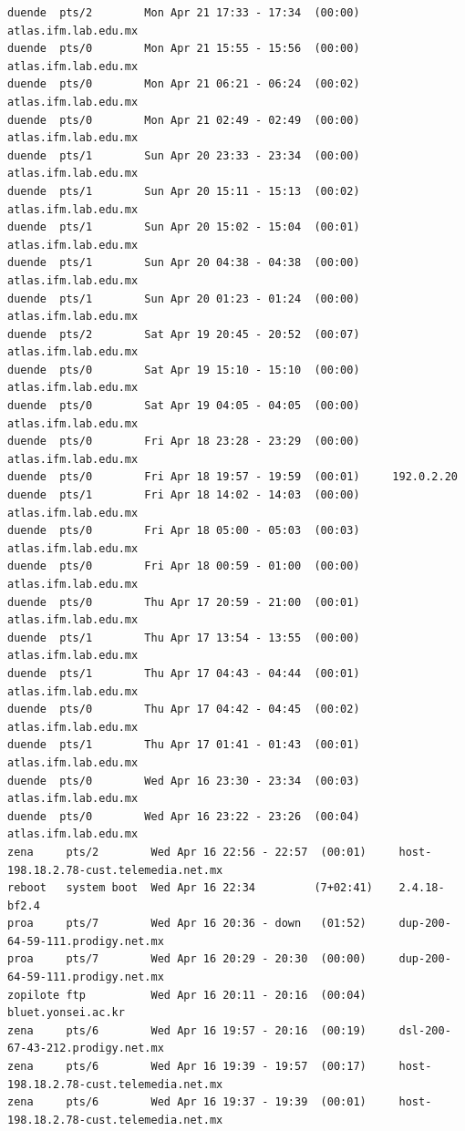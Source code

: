 \begin{lstlisting}[style=terminal]
duende  pts/2        Mon Apr 21 17:33 - 17:34  (00:00)     atlas.ifm.lab.edu.mx
duende  pts/0        Mon Apr 21 15:55 - 15:56  (00:00)     atlas.ifm.lab.edu.mx
duende  pts/0        Mon Apr 21 06:21 - 06:24  (00:02)     atlas.ifm.lab.edu.mx
duende  pts/0        Mon Apr 21 02:49 - 02:49  (00:00)     atlas.ifm.lab.edu.mx
duende  pts/1        Sun Apr 20 23:33 - 23:34  (00:00)     atlas.ifm.lab.edu.mx
duende  pts/1        Sun Apr 20 15:11 - 15:13  (00:02)     atlas.ifm.lab.edu.mx
duende  pts/1        Sun Apr 20 15:02 - 15:04  (00:01)     atlas.ifm.lab.edu.mx
duende  pts/1        Sun Apr 20 04:38 - 04:38  (00:00)     atlas.ifm.lab.edu.mx
duende  pts/1        Sun Apr 20 01:23 - 01:24  (00:00)     atlas.ifm.lab.edu.mx
duende  pts/2        Sat Apr 19 20:45 - 20:52  (00:07)     atlas.ifm.lab.edu.mx
duende  pts/0        Sat Apr 19 15:10 - 15:10  (00:00)     atlas.ifm.lab.edu.mx
duende  pts/0        Sat Apr 19 04:05 - 04:05  (00:00)     atlas.ifm.lab.edu.mx
duende  pts/0        Fri Apr 18 23:28 - 23:29  (00:00)     atlas.ifm.lab.edu.mx
duende  pts/0        Fri Apr 18 19:57 - 19:59  (00:01)     192.0.2.20
duende  pts/1        Fri Apr 18 14:02 - 14:03  (00:00)     atlas.ifm.lab.edu.mx
duende  pts/0        Fri Apr 18 05:00 - 05:03  (00:03)     atlas.ifm.lab.edu.mx
duende  pts/0        Fri Apr 18 00:59 - 01:00  (00:00)     atlas.ifm.lab.edu.mx
duende  pts/0        Thu Apr 17 20:59 - 21:00  (00:01)     atlas.ifm.lab.edu.mx
duende  pts/1        Thu Apr 17 13:54 - 13:55  (00:00)     atlas.ifm.lab.edu.mx
duende  pts/1        Thu Apr 17 04:43 - 04:44  (00:01)     atlas.ifm.lab.edu.mx
duende  pts/0        Thu Apr 17 04:42 - 04:45  (00:02)     atlas.ifm.lab.edu.mx
duende  pts/1        Thu Apr 17 01:41 - 01:43  (00:01)     atlas.ifm.lab.edu.mx
duende  pts/0        Wed Apr 16 23:30 - 23:34  (00:03)     atlas.ifm.lab.edu.mx
duende  pts/0        Wed Apr 16 23:22 - 23:26  (00:04)     atlas.ifm.lab.edu.mx
zena     pts/2        Wed Apr 16 22:56 - 22:57  (00:01)     host-198.18.2.78-cust.telemedia.net.mx
reboot   system boot  Wed Apr 16 22:34         (7+02:41)    2.4.18-bf2.4
proa     pts/7        Wed Apr 16 20:36 - down   (01:52)     dup-200-64-59-111.prodigy.net.mx
proa     pts/7        Wed Apr 16 20:29 - 20:30  (00:00)     dup-200-64-59-111.prodigy.net.mx
zopilote ftp          Wed Apr 16 20:11 - 20:16  (00:04)     bluet.yonsei.ac.kr
zena     pts/6        Wed Apr 16 19:57 - 20:16  (00:19)     dsl-200-67-43-212.prodigy.net.mx
zena     pts/6        Wed Apr 16 19:39 - 19:57  (00:17)     host-198.18.2.78-cust.telemedia.net.mx
zena     pts/6        Wed Apr 16 19:37 - 19:39  (00:01)     host-198.18.2.78-cust.telemedia.net.mx

\end{lstlisting}
